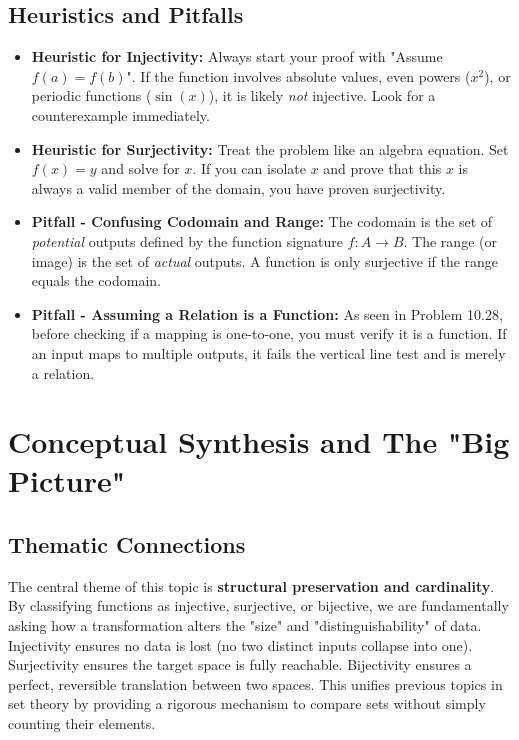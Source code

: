 \documentclass[11pt, a4paper]{article}
\theoremstyle{definition}
\theoremstyle{remark}
\begin{document}
\subsection{Heuristics and Pitfalls}
\begin{itemize}
    \item \textbf{Heuristic for Injectivity:} Always start your proof with "Assume $f(a) = f(b)$". If the function involves absolute values, even powers ($x^2$), or periodic functions ($\sin(x)$), it is likely \textit{not} injective. Look for a counterexample immediately.
    \item \textbf{Heuristic for Surjectivity:} Treat the problem like an algebra equation. Set $f(x) = y$ and solve for $x$. If you can isolate $x$ and prove that this $x$ is always a valid member of the domain, you have proven surjectivity.
    \item \textbf{Pitfall - Confusing Codomain and Range:} The codomain is the set of \textit{potential} outputs defined by the function signature $f: A \to B$. The range (or image) is the set of \textit{actual} outputs. A function is only surjective if the range equals the codomain.
    \item \textbf{Pitfall - Assuming a Relation is a Function:} As seen in Problem 10.28, before checking if a mapping is one-to-one, you must verify it is a function. If an input maps to multiple outputs, it fails the vertical line test and is merely a relation.
\end{itemize}

\newpage
\section{Conceptual Synthesis and The "Big Picture"}

\subsection{Thematic Connections}
The central theme of this topic is \textbf{structural preservation and cardinality}. By classifying functions as injective, surjective, or bijective, we are fundamentally asking how a transformation alters the "size" and "distinguishability" of data. Injectivity ensures no data is lost (no two distinct inputs collapse into one). Surjectivity ensures the target space is fully reachable. Bijectivity ensures a perfect, reversible translation between two spaces. This unifies previous topics in set theory by providing a rigorous mechanism to compare sets without simply counting their elements.
\end{document}

